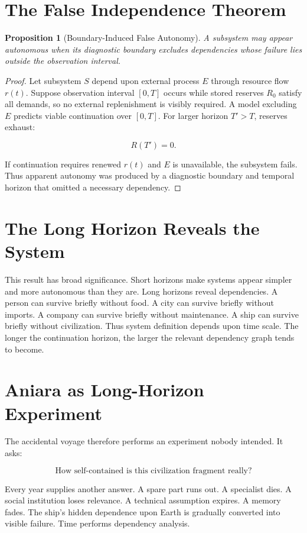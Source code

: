 \documentclass[11pt,oneside]{book}
\newtheorem{proposition}[theorem]{Proposition}
\theoremstyle{definition}
\theoremstyle{remark}
\begin{document}
\section{The False Independence Theorem}

\begin{proposition}[Boundary-Induced False Autonomy] A subsystem may appear autonomous when its
diagnostic boundary excludes dependencies whose failure lies outside the observation interval.
\end{proposition} \begin{proof} Let subsystem \(S\) depend upon external process \(E\) through
resource flow \(r(t)\). Suppose observation interval \([0,T]\) occurs while stored reserves \(R_0\)
satisfy all demands, so no external replenishment is visibly required. A model excluding \(E\)
predicts viable continuation over \([0,T]\). For larger horizon \(T'>T\), reserves exhaust:

\[
R(T')=0.
\]

If continuation requires renewed \(r(t)\) and \(E\) is unavailable, the subsystem fails. Thus
apparent autonomy was produced by a diagnostic boundary and temporal horizon that omitted a
necessary dependency. \end{proof}

\section{The Long Horizon Reveals the System}

This result has broad significance. Short horizons make systems appear simpler and more autonomous
than they are. Long horizons reveal dependencies. A person can survive briefly without food. A city
can survive briefly without imports. A company can survive briefly without maintenance. A ship can
survive briefly without civilization. Thus system definition depends upon time scale. The longer the
continuation horizon, the larger the relevant dependency graph tends to become.

\section{Aniara as Long-Horizon Experiment}

The accidental voyage therefore performs an experiment nobody intended. It asks:

\[
\text{How self-contained is this civilization fragment really?}
\]

Every year supplies another answer. A spare part runs out. A specialist dies. A social institution
loses relevance. A technical assumption expires. A memory fades. The ship's hidden dependence upon
Earth is gradually converted into visible failure. Time performs dependency analysis.
\end{document}
